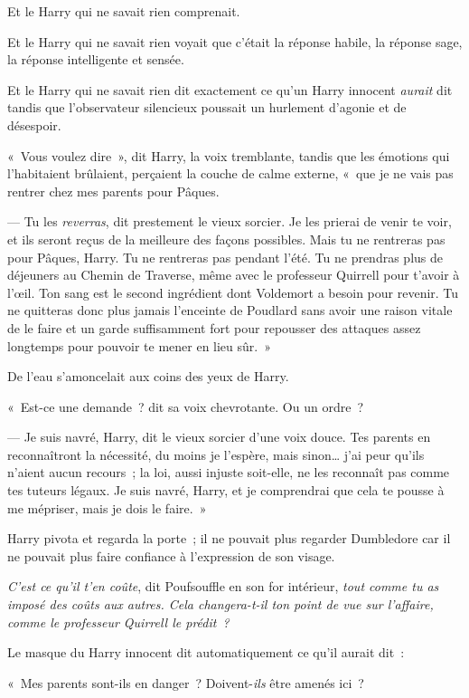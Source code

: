 Et le Harry qui ne savait rien comprenait.

Et le Harry qui ne savait rien voyait que c'était la réponse habile, la réponse sage, la réponse intelligente et sensée.

Et le Harry qui ne savait rien dit exactement ce qu'un Harry innocent \emph{aurait} dit tandis que l'observateur silencieux poussait un hurlement d'agonie et de désespoir.

«~Vous voulez dire~», dit Harry, la voix tremblante, tandis que les émotions qui l'habitaient brûlaient, perçaient la couche de calme externe, «~que je ne vais pas rentrer chez mes parents pour Pâques.

--- Tu les \emph{reverras}, dit prestement le vieux sorcier.
Je les prierai de venir te voir, et ils seront reçus de la meilleure des façons possibles.
Mais tu ne rentreras pas pour Pâques, Harry.
Tu ne rentreras pas pendant l'été.
Tu ne prendras plus de déjeuners au Chemin de Traverse, même avec le professeur Quirrell pour t'avoir à l'œil.
Ton sang est le second ingrédient dont Voldemort a besoin pour revenir.
Tu ne quitteras donc plus jamais l'enceinte de Poudlard sans avoir une raison vitale de le faire et un garde suffisamment fort pour repousser des attaques assez longtemps pour pouvoir te mener en lieu sûr.~»

De l'eau s'amoncelait aux coins des yeux de Harry.

«~Est-ce une demande~? dit sa voix chevrotante.
Ou un ordre~?

--- Je suis navré, Harry, dit le vieux sorcier d'une voix douce.
Tes parents en reconnaîtront la nécessité, du moins je l'espère, mais sinon… j'ai peur qu'ils n'aient aucun recours~; la loi, aussi injuste soit-elle, ne les reconnaît pas comme tes tuteurs légaux.
Je suis navré, Harry, et je comprendrai que cela te pousse à me mépriser, mais je dois le faire.~»

Harry pivota et regarda la porte~; il ne pouvait plus regarder Dumbledore car il ne pouvait plus faire confiance à l'expression de son visage.

\emph{C'est ce qu'il t'en coûte}, dit Poufsouffle en son for intérieur, \emph{tout comme tu as imposé des coûts aux autres.
Cela changera-t-il ton point de vue sur l'affaire, comme le professeur Quirrell le prédit~?}

Le masque du Harry innocent dit automatiquement ce qu'il aurait dit~:

«~Mes parents sont-ils en danger~?
Doivent-\emph{ils} être amenés ici~?

